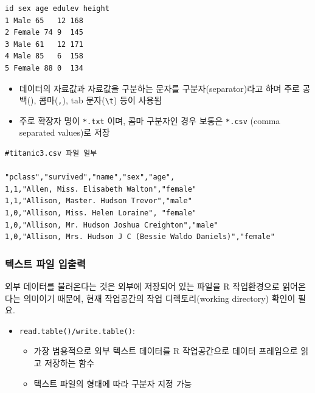\documentclass[
  11pt,
]{krantz}
\makeatletter
\providecommand{\tightlist}{%
  \setlength{\itemsep}{0pt}\setlength{\parskip}{0pt}}
\newenvironment{kframe}{%
\medskip{}
\setlength{\fboxsep}{.8em}
 \def\at@end@of@kframe{}%
 \ifinner\ifhmode%
  \def\at@end@of@kframe{\end{minipage}}%
  \begin{minipage}{\columnwidth}%
 \fi\fi%
 \def\FrameCommand##1{\hskip\@totalleftmargin \hskip-\fboxsep
 \colorbox{shadecolor}{##1}\hskip-\fboxsep
     \hskip-\linewidth \hskip-\@totalleftmargin \hskip\columnwidth}%
 \MakeFramed {\advance\hsize-\width
   \@totalleftmargin\z@ \linewidth\hsize
   \@setminipage}}%
 {\par\unskip\endMakeFramed%
 \at@end@of@kframe}
\newenvironment{rmdblock}[1]
  {
  \begin{itemize}
  \renewcommand{\labelitemi}{
    \raisebox{-.7\height}[0pt][0pt]{
      {\setkeys{Gin}{width=3em,keepaspectratio}\texttt{[image: images/\#1]}}
    }
  }
  \setlength{\fboxsep}{1em}
  \begin{kframe}
  \item
  }
  {
  \end{kframe}
  \end{itemize}
  }
\newenvironment{rmdcaution}
  {\begin{rmdblock}{caution}}
  {\end{rmdblock}}
\makeatother
\begin{document}
\begin{verbatim}
id sex age edulev height 
1 Male 65   12 168
2 Female 74 9  145
3 Male 61   12 171
4 Male 85   6  158
5 Female 88 0  134
\end{verbatim}

\begin{itemize}
\tightlist
\item
  데이터의 자료값과 자료값을 구분하는 문자를 구분자(separator)라고 하며 주로 공백(\texttt{}), 콤마(\texttt{,}), tab 문자(\texttt{\textbackslash{}t}) 등이 사용됨
\item
  주로 확장자 명이 \texttt{*.txt} 이며, 콤마 구분자인 경우 보통은 \texttt{*.csv} (comma separated values)로 저장
\end{itemize}

\begin{verbatim}
#titanic3.csv 파일 일부 

"pclass","survived","name","sex","age",
1,1,"Allen, Miss. Elisabeth Walton","female"
1,1,"Allison, Master. Hudson Trevor","male"
1,0,"Allison, Miss. Helen Loraine", "female"
1,0,"Allison, Mr. Hudson Joshua Creighton","male"
1,0,"Allison, Mrs. Hudson J C (Bessie Waldo Daniels)","female"
\end{verbatim}

\hypertarget{text-import-export}{%
\subsubsection*{\texorpdfstring{\textbf{텍스트 파일 입출력}}{텍스트 파일 입출력}}\label{text-import-export}}


\footnotesize

\begin{rmdcaution}
\begin{rmdcaution}

외부 데이터를 불러온다는 것은 외부에 저장되어 있는 파일을 R 작업환경으로 읽어온다는 의미이기 때문에, 현재 작업공간의 작업 디렉토리(working directory) 확인이 필요.

\end{rmdcaution}
\end{rmdcaution}

\normalsize

\begin{itemize}
\tightlist
\item
  \texttt{read.table()/write.table()}:

  \begin{itemize}
  \tightlist
  \item
    가장 범용적으로 외부 텍스트 데이터를 R 작업공간으로 데이터 프레임으로 읽고 저장하는 함수
  \item
    텍스트 파일의 형태에 따라 구분자 지정 가능
  \end{itemize}
\end{itemize}
\end{document}
